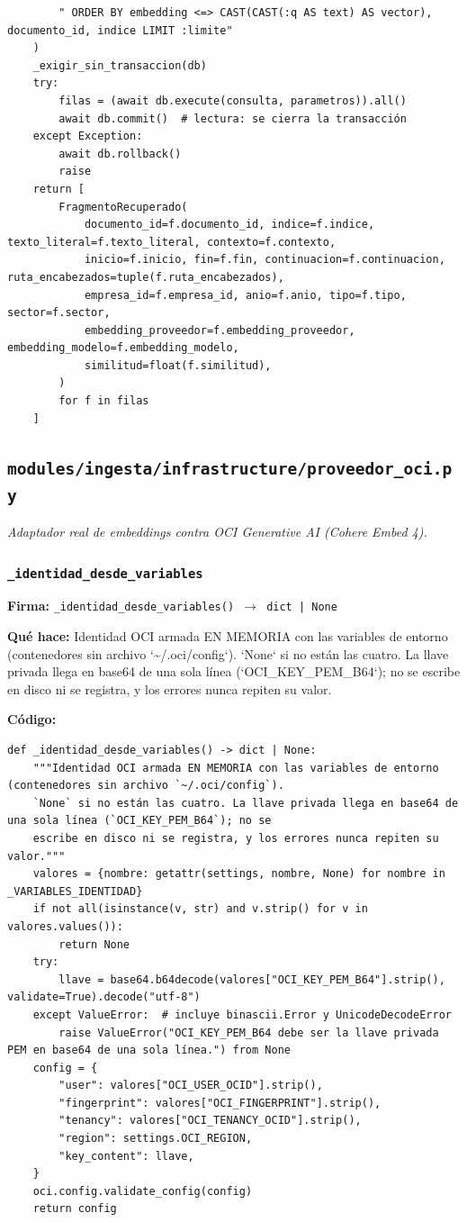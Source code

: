 \documentclass[11pt,a4paper]{article}
\begin{document}
\begin{lstlisting}
        " ORDER BY embedding <=> CAST(CAST(:q AS text) AS vector), documento_id, indice LIMIT :limite"
    )
    _exigir_sin_transaccion(db)
    try:
        filas = (await db.execute(consulta, parametros)).all()
        await db.commit()  # lectura: se cierra la transacción
    except Exception:
        await db.rollback()
        raise
    return [
        FragmentoRecuperado(
            documento_id=f.documento_id, indice=f.indice, texto_literal=f.texto_literal, contexto=f.contexto,
            inicio=f.inicio, fin=f.fin, continuacion=f.continuacion, ruta_encabezados=tuple(f.ruta_encabezados),
            empresa_id=f.empresa_id, anio=f.anio, tipo=f.tipo, sector=f.sector,
            embedding_proveedor=f.embedding_proveedor, embedding_modelo=f.embedding_modelo,
            similitud=float(f.similitud),
        )
        for f in filas
    ]
\end{lstlisting}

\subsection{\texttt{modules/ingesta/infrastructure/proveedor\_oci.py}}
\textit{Adaptador real de embeddings contra OCI Generative AI (Cohere Embed 4).}

\subsubsection*{\texttt{\_identidad\_desde\_variables}}
\textbf{Firma:} \texttt{\_identidad\_desde\_variables() $\rightarrow$ dict | None}

\textbf{Qué hace:} Identidad OCI armada EN MEMORIA con las variables de entorno (contenedores sin archivo `\textasciitilde{}/.oci/config`).
`None` si no están las cuatro. La llave privada llega en base64 de una sola línea (`OCI\_KEY\_PEM\_B64`); no se
escribe en disco ni se registra, y los errores nunca repiten su valor.

\textbf{Código:}
\begin{lstlisting}
def _identidad_desde_variables() -> dict | None:
    """Identidad OCI armada EN MEMORIA con las variables de entorno (contenedores sin archivo `~/.oci/config`).
    `None` si no están las cuatro. La llave privada llega en base64 de una sola línea (`OCI_KEY_PEM_B64`); no se
    escribe en disco ni se registra, y los errores nunca repiten su valor."""
    valores = {nombre: getattr(settings, nombre, None) for nombre in _VARIABLES_IDENTIDAD}
    if not all(isinstance(v, str) and v.strip() for v in valores.values()):
        return None
    try:
        llave = base64.b64decode(valores["OCI_KEY_PEM_B64"].strip(), validate=True).decode("utf-8")
    except ValueError:  # incluye binascii.Error y UnicodeDecodeError
        raise ValueError("OCI_KEY_PEM_B64 debe ser la llave privada PEM en base64 de una sola línea.") from None
    config = {
        "user": valores["OCI_USER_OCID"].strip(),
        "fingerprint": valores["OCI_FINGERPRINT"].strip(),
        "tenancy": valores["OCI_TENANCY_OCID"].strip(),
        "region": settings.OCI_REGION,
        "key_content": llave,
    }
    oci.config.validate_config(config)
    return config
\end{lstlisting}
\end{document}
